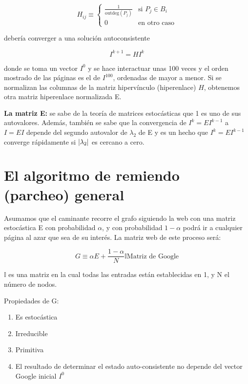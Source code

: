 \[
H_{ij} \equiv \begin{cases}
\frac{1}{\mathrm{outdeg}(P_j)} & \text{si } P_j \in B_i \\
0 & \text{en otro caso}
\end{cases}
\]

debería converger a una solución autoconsistente

\[
I^{k+1} = H I^k
\]

donde se toma un vector $I^{0}$ y se hace interactuar unas 100 veces y el orden mostrado de las páginas es el de $I^{100}$, ordenadas de mayor a menor. Si se normalizan las columnas de la matriz hipervínculo (hiperenlace) $H$, obtenemos otra matriz hiperenlace normalizada E.

\textbf{La matriz E:} se sabe de la teoría de matrices estocásticas que 1 es uno de sus autovalores. Además, también se sabe que la convergencia de $I^k = E I^{k-1}$ a $I = E I$ depende del segundo autovalor de $\lambda_2$ de E y es un hecho que $I^k = E I^{k-1}$ converge rápidamente si $\abs{\lambda_2}$ es
cercano a cero.

\section{El algoritmo de remiendo (parcheo) general}

Asumamos que el caminante recorre el grafo siguiendo la web con una matriz estocástica E con probabilidad $\alpha$, y con probabilidad $1-\alpha$ podrá ir a cualquier página al azar que sea de su interés. La matriz web de este proceso será:

\[
G \equiv \alpha E + \frac{1-\alpha}{N} \mathds{I} \text{Matriz de Google}
\]

$\mathds{I}$ es una matriz en la cual todas las entradas están establecidas en 1, y N el número de nodos.

Propiedades de G:
\begin{enumerate}
\item Es estocástica
\item Irreducible
\item Primitiva
\item El resultado de determinar el estado auto-consistente no depende del vector Google inicial $I^0$
\end{enumerate}

